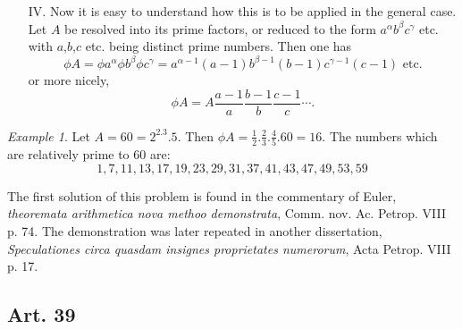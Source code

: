 \documentclass{book}
\theoremstyle{plain}
\theoremstyle{remark}
\newtheorem*{example}{Example}
\begin{document}
\begin{itemize}
\item[IV.] Now it is easy to understand how this is to be applied in the general case. Let $A$ be resolved into its prime factors, or reduced to the form $a^{\alpha}b^{\beta}c^{\gamma}$ etc. with $a$,$b$,$c$ etc. being distinct prime numbers.  Then one has
\[ \phi A = \phi a^\alpha \phi b^{\beta} \phi c^{\gamma} = a^{\alpha-1}(a-1) b^{\beta-1}(b-1)c^{\gamma-1}(c-1) \textrm{ etc.} \]
or more nicely,
\[ \phi A = A \frac{a-1}{a} \frac{b-1}{b} \frac{c-1}{c} \cdots. \]
\end{itemize}
\begin{example} Let $A = 60=2^2.3.5$.  Then $\phi A = \frac{1}{2} . \frac{2}{3} . \frac{4}{5} . 60 = 16$.  The numbers which are relatively prime to $60$ are:
 \[ 1,7,11,13,17,19,23,29,31,37,41,43,47,49,53,59 \]
\end{example}

The first solution of this problem is found in the commentary of Euler, \textit{theoremata arithmetica nova methoo demonstrata}, Comm. nov. Ac. Petrop. VIII p. 74.  The demonstration was later repeated in another dissertation, \textit{Speculationes circa quasdam insignes proprietates numerorum}, Acta Petrop. VIII p. 17. 

\subsection*{Art. 39} 
\end{document}
